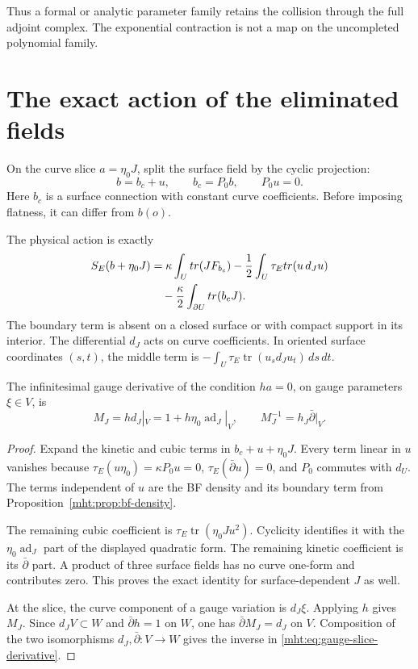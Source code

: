 Thus a formal or analytic parameter family retains the collision through
the full adjoint complex. The exponential contraction is not a map on
the uncompleted polynomial family.

\section{The exact action of the eliminated fields}

On the curve slice $a=\eta_0J$, split the surface field by the cyclic
projection:
\[
 b=b_c+u,\qquad b_c=P_0b,\qquad P_0u=0.
\]
Here $b_c$ is a surface connection with constant curve coefficients.
Before imposing flatness, it can differ from $b(o)$.

\begin{proposition}\label{mht:prop:exact-slice-action}
The physical action is exactly
\begin{align}
 S_E(b+\eta_0J)
  &=\kappa\int_U\operatorname{tr}(JF_{b_c})
     -\frac12\int_U\tau_E\operatorname{tr}(u\,d_Ju)\notag\\
  &\hspace{1em}
     -\frac{\kappa}{2}\int_{\partial U}\operatorname{tr}(b_cJ).
       \label{mht:eq:exact-slice-action}
\end{align}
The boundary term is absent on a closed surface or with compact support
in its interior. The differential $d_J$ acts on curve coefficients.
In oriented surface coordinates $(s,t)$, the middle term is
$-\int_U\tau_E\operatorname{tr}(u_s d_Ju_t)\,ds\,dt$.

The infinitesimal gauge derivative of the condition $ha=0$, on gauge
parameters $\xi\in V$, is
\begin{equation}\label{mht:eq:gauge-slice-derivative}
 M_J=hd_J|_V=1+h\eta_0\operatorname{ad}_J|_V,\qquad
 M_J^{-1}=h_J\bar\partial|_V.
\end{equation}
\end{proposition}

\begin{proof}
Expand the kinetic and cubic terms in $b_c+u+\eta_0J$.
Every term linear in $u$ vanishes because
$\tau_E(u\eta_0)=\kappa P_0u=0$,
$\tau_E(\bar\partial u)=0$, and $P_0$ commutes with $d_U$.
The terms independent of $u$ are the BF density and its boundary
term from Proposition~\ref{mht:prop:bf-density}.

The remaining cubic coefficient is
$\tau_E\operatorname{tr}(\eta_0Ju^2)$.
Cyclicity identifies it with the
$\eta_0\operatorname{ad}_J$ part of the displayed quadratic form.
The remaining kinetic coefficient is its $\bar\partial$ part.
A product of three surface fields has no curve one-form and
contributes zero. This proves the exact identity for
surface-dependent $J$ as well.

At the slice, the curve component of a gauge variation is $d_J\xi$.
Applying $h$ gives $M_J$. Since $d_JV\subset W$ and
$\bar\partial h=1$ on $W$, one has $\bar\partial M_J=d_J$ on $V$.
Composition of the two isomorphisms $d_J,\bar\partial:V\to W$ gives
the inverse in \eqref{mht:eq:gauge-slice-derivative}.
\end{proof}

